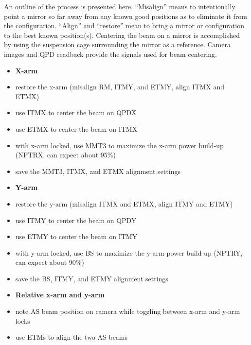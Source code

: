 An outline of the process is presented here. ``Misalign'' means to
intentionally point a mirror so far away from any known good positions
as to eliminate it from the configuration.  ``Align'' and ``restore''
mean to bring a mirror or configuration to the best known
position(s). Centering the beam on a mirror is accomplished by using
the suspension cage surrounding the mirror as a reference. Camera
images and QPD readback provide the signals used for beam centering. 

\begin{itemize}
\item[] \textbf{X-arm} \vspace{-10pt}
\item restore the x-arm (misalign RM, ITMY, and ETMY, align ITMX and ETMX) \vspace{-10pt}
\item use ITMX to center the beam on QPDX \vspace{-10pt}
\item use ETMX to center the beam on ITMX \vspace{-10pt}
\item with x-arm locked, use MMT3 to maximize the x-arm power build-up (NPTRX, can expect
  about 95\%) \vspace{-10pt}
\item save the MMT3, ITMX, and ETMX alignment settings 
\item[] \textbf{Y-arm} \vspace{-10pt}
\item restore the y-arm (misalign ITMX and ETMX, align ITMY and ETMY) \vspace{-10pt}
\item use ITMY to center the beam on QPDY \vspace{-10pt}
\item use ETMY to center the beam on ITMY \vspace{-10pt}
\item with y-arm locked, use BS to maximize the y-arm power build-up (NPTRY, can expect
  about 90\%) \vspace{-10pt}
\item save the BS, ITMY, and ETMY alignment settings 
\item[] \textbf{Relative x-arm and y-arm} \vspace{-10pt}
\item note AS beam position on camera while toggling between x-arm and
  y-arm locks\vspace{-10pt}
\item use ETMs to align the two AS beams \vspace{-10pt}

\end{itemize}

